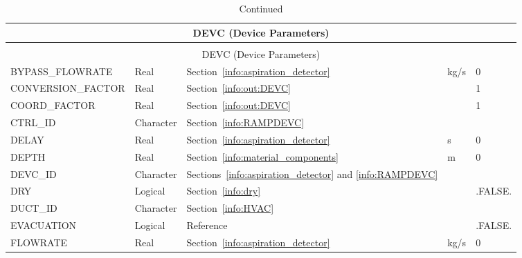 \documentclass[11pt]{book}
\begin{document}
\begin{longtable}{@{\extracolsep{\fill}}|l|l|l|l|l|}
\caption[Device parameters ({\ct DEVC} namelist group)]{For more information see Section~\ref{info:DEVC}.}
\label{tbl:DEVC} \\
\hline
\multicolumn{5}{|c|}{{\ct DEVC} (Device Parameters)} \\
\hline \hline
\endfirsthead
\caption[]{Continued} \\
\hline
\multicolumn{5}{|c|}{{\ct DEVC} (Device Parameters)} \\
\hline \hline
\endhead
{\ct BYPASS\_FLOWRATE}      & Real            & Section~\ref{info:aspiration_detector}                          & kg/s  & 0             \\ \hline
{\ct CONVERSION\_FACTOR}    & Real            & Section~\ref{info:out:DEVC}                                     &       & 1             \\ \hline
{\ct COORD\_FACTOR}         & Real            & Section~\ref{info:out:DEVC}                                     &       & 1             \\ \hline
{\ct CTRL\_ID}              & Character       & Section~\ref{info:RAMPDEVC}                                     &       &               \\ \hline
{\ct DELAY}                 & Real            & Section~\ref{info:aspiration_detector}                          & s     & 0             \\ \hline
{\ct DEPTH}                 & Real            & Section~\ref{info:material_components}                          & m     & 0             \\ \hline
{\ct DEVC\_ID}              & Character       & Sections~\ref{info:aspiration_detector} and \ref{info:RAMPDEVC} &       &               \\ \hline
{\ct DRY}                   & Logical         & Section~\ref{info:dry}                                          &       & {\ct .FALSE.} \\ \hline
{\ct DUCT\_ID}              & Character       & Section~\ref{info:HVAC}                                         &       &               \\ \hline
{\ct EVACUATION}            & Logical         & Reference~\cite{FDS_Evac_Users_Guide}                           &       & {\ct .FALSE.} \\ \hline
{\ct FLOWRATE}              & Real            & Section~\ref{info:aspiration_detector}                          & kg/s  & 0             \\ \hline

\end{longtable}
\end{document}
